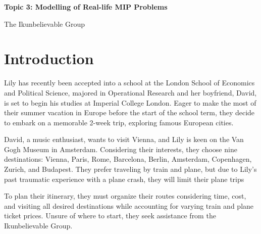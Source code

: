 \documentclass{article}
\newcommand{\titlefont}{\fontsize{21}{32}\selectfont}
\newcommand{\authorfont}{\fontsize{20.74}{24}\selectfont}
\begin{document}
\begin{titlepage}
  \centering
  \vspace*{5cm}
  {\titlefont\textbf{\color{black}Topic 3: Modelling of Real-life MIP Problems}\par}
  \vspace{1.5cm}
  {\authorfont\color{black} The Ikunbelievable Group\par}
  \vfill
\end{titlepage}

\tableofcontents
\clearpage

\renewcommand{\thefootnote}{\fnsymbol{footnote}}
\renewcommand{\thefootnote}{\arabic{footnote}}

\section{Introduction}

Lily has recently been accepted into a school at the London School of Economics
and Political Science, majored in Operational Research and her boyfriend,
David, is set to begin his studies at Imperial College London. Eager to make
the most of their summer vacation in Europe before the start of the school
term, they decide to embark on a memorable 2-week trip, exploring famous
European cities.

David, a music enthusiast, wants to visit Vienna, and Lily is keen on the Van
Gogh Museum in Amsterdam. Considering their interests, they choose nine
destinations: Vienna, Paris, Rome, Barcelona, Berlin, Amsterdam, Copenhagen,
Zurich, and Budapest. They prefer traveling by train and plane, but due to
Lily's past traumatic experience with a plane crash, they will limit their
plane trips

To plan their itinerary, they must organize their routes considering time,
cost, and visiting all desired destinations while accounting for varying train
and plane ticket prices. Unsure of where to start, they seek assistance from
the Ikunbelievable Group.
\end{document}
